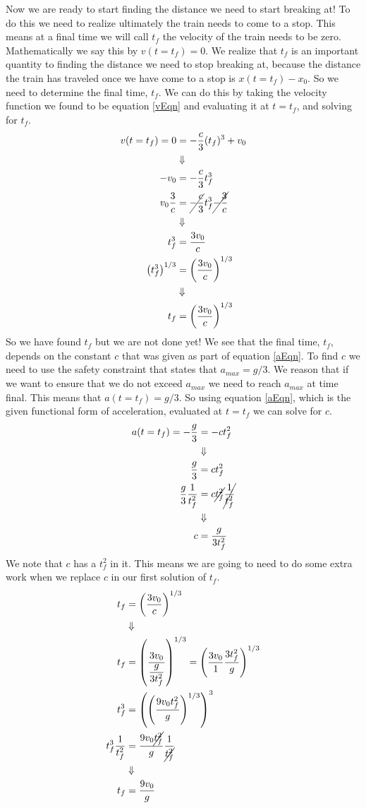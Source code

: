 \documentclass[11pt]{article}
\begin{document}
Now we are ready to start finding the distance we need to start breaking at! To do this we 
need to realize ultimately the train needs to come to a stop. This means at a final time we
will call $t_f$ the velocity of the train needs to be zero. Mathematically we say this by 
$v(t=t_f) = 0$. We realize that $t_f$ is an important quantity to finding the distance we 
need to stop breaking at, because the distance the train has traveled once we have come to a
stop is $x(t=t_f) - x_0$. So we need to determine the final time, $t_f$. We can do this by 
taking the velocity function we found to be equation \ref{vEqn} and evaluating it at $t=t_f$,
and solving for $t_f$.
\begin{align*}
v(t=t_f) = 0 &= -\frac{c}{3}(t_f)^3 + v_0\\
&\Downarrow\\
-v_0 &= -\frac{c}{3}t_f^3 \\
v_0\frac{3}{c} &= \cancel{-\frac{c}{3}}t_f^3\cancel{-\frac{3}{c}}\\
&\Downarrow\\
t_f^3 &= \frac{3v_0}{c}\\
\left(t_f^3\right)^{1/3} &= \left(\frac{3v_0}{c}\right)^{1/3}\\
&\Downarrow\\
t_f &= \left(\frac{3v_0}{c}\right)^{1/3}
\end{align*}
So we have found $t_f$ but we are not done yet! We see that the final time, $t_f$, depends 
on the constant $c$ that was given as part of equation \ref{aEqn}. To find $c$ we need to 
use the safety constraint that states that $a_{max} = g/3$. We reason that if we want to 
ensure that we do not exceed $a_{max}$ we need to reach $a_{max}$ at time final. This means
that $a(t=t_f) = g/3$. So using equation \ref{aEqn}, which is the given functional form of 
acceleration, evaluated at $t=t_f$ we can solve for $c$.
\begin{align*}
a(t=t_f) = -\frac{g}{3} &= -ct^2_f\\
&\Downarrow\\
\frac{g}{3} &= ct^2_f\\
\frac{g}{3}\frac{1}{t_f^2} &= c\cancel{t_f^2}\cancel{\frac{1}{t_f^2}}\\
&\Downarrow\\
c &= \frac{g}{3t_f^2}
\end{align*}
We note that $c$ has a $t_f^2$ in it. This means we are going to need to do some extra work
when we replace $c$ in our first solution of $t_f$.
\begin{align*}
t_f &= \left(\frac{3v_0}{c}\right)^{1/3}\\
&\Downarrow\\
t_f &= \left(\frac{3v_0}{\dfrac{g}{3t_f^2}}\right)^{1/3} = \left(\frac{3v_0}{1}\frac{3t_f^2}{g}\right)^{1/3}\\
t_f^3 &= \left(\left(\frac{9v_0t_f^2}{g}\right)^{1/3}\right)^3\\
t_f^3\frac{1}{t_f^2} &= \frac{9v_0\cancel{t_f^2}}{g}\frac{1}{\cancel{t_f^2}}\\
&\Downarrow\\
t_f &= \frac{9v_0}{g}
\end{align*}
\end{document}
